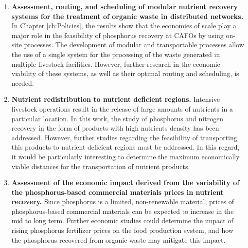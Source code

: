 \begin{enumerate}[font=\bfseries]
	\item \textbf{Assessment, routing, and scheduling of modular nutrient recovery systems for the treatment of organic waste in distributed networks.} In Chapter \ref{ch:Policies}, the results show that the economies of scale play a major role in the feasibility of phosphorus recovery at CAFOs by using on-site processes. The development of modular and transportable processes allow the use of a single system for the processing of the waste generated in multiple livestock facilities. However, further research in the economic viability of these systems, as well as their optimal routing and scheduling, is needed.
	
	\item \textbf{Nutrient redistribution to nutrient deficient regions.} Intensive livestock operations result in the release of large amounts of nutrients in a particular location. In this work, the study of phosphorus and nitrogen recovery in the form of products with high nutrients density has been addressed. However, further studies regarding the feasibility of transporting this products to nutrient deficient regions must be addressed. In this regard, it would be particularly interesting to determine the maximum economically viable distances for the transportation of nutrient products.
	
	\item \textbf{Assessment of the economic impact derived from the variability of the phosphorus-based commercial materials prices in nutrient recovery.} Since phosphorus is a limited, non-renewable material, prices of phosphorus-based commercial materials can be expected to increase in the mid to long term. Further economic studies could determine the impact of rising phosphorus fertilizer prices on the food production system, and how the phosphorus recovered from organic waste may mitigate this impact.
	

\end{enumerate}
